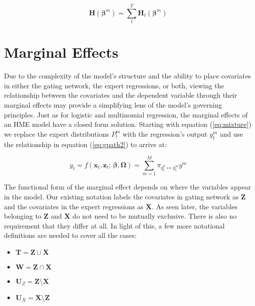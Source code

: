 \documentclass[12pt]{article}
\newcommand{\Ht}[1]{\mathbf{H}_{t}(#1)}
\newcommand{\HH}[1]{\boldsymbol{H}(#1)}
\newcommand{\gateprod}[2]{\pi_{#1 \longleftrightarrow #2}}
\begin{document}
\begin{equation}
  \HH{\boldsymbol{\beta}^{m}} = \sum_{t}^{T} \Ht{\boldsymbol{\beta}^{m}}
\end{equation}



\section{Marginal Effects} \label{sec:MarginalEffects}

Due to the complexity of the model's structure and the ability to 
place covariates in either the gating network, the expert regressions,
or both, viewing the relationship between the covariates and the dependent
variable through their marginal effects may provide a simplifying lens of the 
model's governing principles. Just as for logistic and multinomial regression,
the marginal effects of an HME model have a closed form solution. Starting
with equation (\ref{eq:mixture}) we replace the expert distributions
$P^{m}_{t}$ with the regression's output $y^{m}_{t}$ and use
the relationship in equation (\ref{eq:gpath2}) to arrive at: 

\begin{equation} \label{eq:mixture2}
  y_{t} = f( \boldsymbol{x}_{t}, \boldsymbol{z}_{t}; \, \boldsymbol{\beta}, \boldsymbol{\Omega}) = \sum_{m=1}^{M} \gateprod{g^{0}_{t}}{y^{m}_{t}} y^{m}
\end{equation}

The functional form of the marginal effect depends on where the variables
appear in the model. Our existing notation labels the covariates in gating
network as $\boldsymbol{Z}$ and the covariates in the expert regressions 
as $\boldsymbol{X}$. As seen later, the variables belonging to
$\boldsymbol{Z}$ and $\boldsymbol{X}$ do not need to be mutually
exclusive. There is also no requirement that they differ at all.
In light of this, a few more notational definitions are needed to cover
all the cases:

\begin{itemize}  
  \item $\boldsymbol{T} = \boldsymbol{Z} \cup \boldsymbol{X}$
  \item $\boldsymbol{W} = \boldsymbol{Z} \cap \boldsymbol{X}$
  \item $\boldsymbol{U}_{Z} = \boldsymbol{Z} \setminus \boldsymbol{X}$
  \item $\boldsymbol{U}_{X} = \boldsymbol{X} \setminus \boldsymbol{Z}$
\end{itemize}
\end{document}
